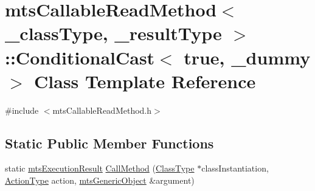 \hypertarget{classmts_callable_read_method_1_1_conditional_cast_3_01true_00_01__dummy_01_4}{\section{mts\-Callable\-Read\-Method$<$ \-\_\-class\-Type, \-\_\-result\-Type $>$\-:\-:Conditional\-Cast$<$ true, \-\_\-dummy $>$ Class Template Reference}
\label{classmts_callable_read_method_1_1_conditional_cast_3_01true_00_01__dummy_01_4}
}


{\ttfamily \#include $<$mts\-Callable\-Read\-Method.\-h$>$}

\subsection*{Static Public Member Functions}
\begin{DoxyCompactItemize}
\item 
static \hyperlink{classmts_execution_result}{mts\-Execution\-Result} \hyperlink{classmts_callable_read_method_1_1_conditional_cast_3_01true_00_01__dummy_01_4_a8b9d29573fa000d56b43efd541744ca9}{Call\-Method} (\hyperlink{classmts_callable_read_method_a44650138085a29d60a4f3cb3616abbbf}{Class\-Type} $\ast$class\-Instantiation, \hyperlink{classmts_callable_read_method_a859894f8cceaba38ff140b96f4b8ae11}{Action\-Type} action, \hyperlink{classmts_generic_object}{mts\-Generic\-Object} \&argument)
\end{DoxyCompactItemize}


